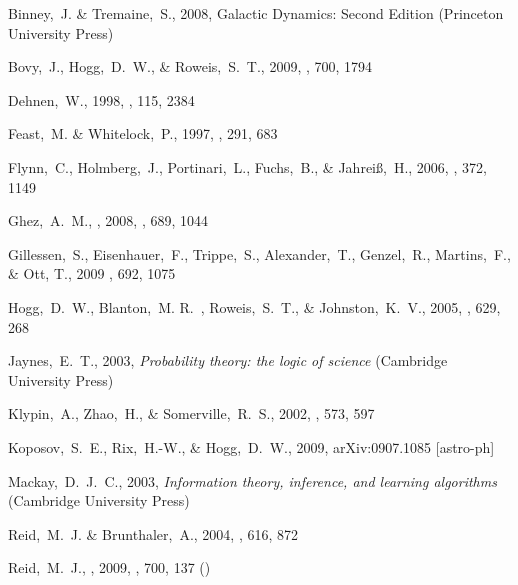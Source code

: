 \begin{thebibliography}{99}
{Binney},~J. \& {Tremaine},~S., 2008, {Galactic Dynamics: Second Edition}
  (Princeton University Press)

 Bovy,~J., Hogg,~D.~W., \& Roweis,~S.~T., 2009,
  \apj, 700, 1794


 Dehnen,~W., 1998, \aj, 115, 2384

 Feast,~M. \& Whitelock,~P., 1997,
  \mnras, 291, 683

  Flynn,~C., Holmberg,~J., Portinari,~L., Fuchs,~B., \& Jahrei{\ss},~H., 2006,
  \mnras, 372, 1149


  Ghez,~A.~M., \etal, 2008,
  \apj, 689, 1044

  Gillessen,~S., Eisenhauer,~F., Trippe,~S., Alexander,~T., Genzel,~R., Martins,~F., \& Ott, T., 2009
  \apj, 692, 1075

  Hogg,~D.~W., Blanton,~M. R.~, Roweis,~S.~T., \& Johnston,~K.~V., 2005,
  \apj, 629, 268

  Jaynes,~E.~T., 2003,
  \textit{Probability theory: the logic of science} (Cambridge University Press)

  Klypin,~A., Zhao,~H., \& Somerville,~R.~S., 2002,
  \apj, 573, 597

 Koposov,~S.~E., Rix,~H.-W., \& Hogg,~D.~W., 2009, arXiv:0907.1085 [astro-ph]

  Mackay,~D.~J.~C., 2003,
  \textit{Information theory, inference, and learning algorithms} (Cambridge University Press)

  Reid,~M.~J. \& Brunthaler,~A., 2004,
  \apj, 616, 872

 Reid,~M.~J., \etal, 2009,
  \apj, 700, 137 (\reid)


\end{thebibliography}
